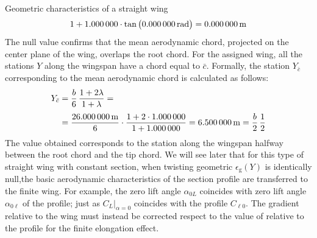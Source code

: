 \documentclass[[12pt,twoside]{book}
\begin{document}
\begin{myExampleX}{Geometric characteristics of a straight wing}{}
\[\begin{split}
{      }{
        1 + \SI[round-precision=0]{\myTaperRatioWing}{}
      }
      \cdot \tan \big( \SI[round-precision=0]{\myLambdaLERad}{\radian} \big)
    = { \SI[round-precision=0]{\myXLEMACWingMT}{\metre} }%
\end{split}
\]
The null value confirms that the mean aerodynamic chord, projected on the center plane of the wing, overlaps the root chord.
\noindent
For the assigned wing, all the stations $Y$ along the wingspan have a chord equal to $\bar{c}$. Formally, the station $Y_{\bar{c}}$ corresponding to the mean aerodynamic chord is calculated as follows:
\[
\begin{split}
Y_{\bar{c}} 
  & {}=
    \frac{b}{6} \, \frac{1+2\lambda}{1+\lambda} = \\[3pt]
  & {}=
    \frac{\SI[round-precision=1]{\mySpanWingMT}{\metre}}{6}
      \cdot 
      \frac{
        1 + 2\cdot\SI[round-precision=2]{\myTaperRatioWing}{}
      }{
        1 + \SI[round-precision=2]{\myTaperRatioWing}{}
      }
    = { \SI[round-precision=2]{\myYMACWingMT}{\metre} }
    = \frac{b}{2} \, \frac{1}{2}
\end{split}
\]
The value obtained corresponds to the station along the wingspan halfway between the root chord and the tip chord. We will see later that for this type of straight wing with constant section, when twisting geometric $\epsilon_\mathrm{g}(Y)$ is identically null,the basic aerodynamic characteristics of the section profile are transferred to the finite wing. For example, the zero lift angle $\alpha_{0L}$ coincides with  zero lift angle $\alpha_{0\ell}$ of the profile; just as $C_L \big|_{\alpha = 0} $ coincides with the profile $C_{\ell 0}$. The gradient  relative to the wing must instead be corrected respect to the value of  relative to the profile for the finite elongation effect.
\end{myExampleX}
\end{document}
